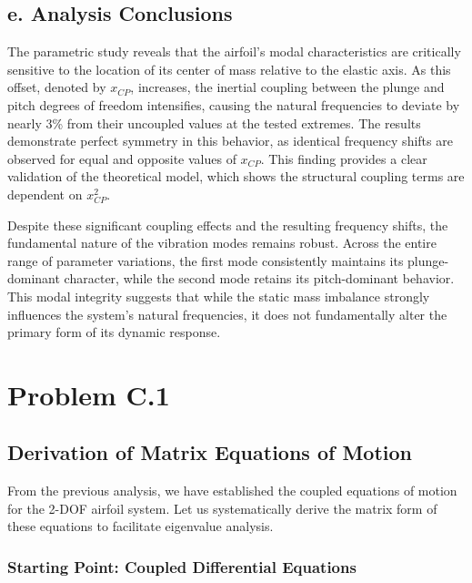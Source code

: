 \documentclass{article}
\begin{document}
\subsection{e. Analysis Conclusions}

The parametric study reveals that the airfoil's modal characteristics are critically sensitive to the location of its center of mass relative to the elastic axis. As this offset, denoted by $x_{CP}$, increases, the inertial coupling between the plunge and pitch degrees of freedom intensifies, causing the natural frequencies to deviate by nearly 3\% from their uncoupled values at the tested extremes. The results demonstrate perfect symmetry in this behavior, as identical frequency shifts are observed for equal and opposite values of $x_{CP}$. This finding provides a clear validation of the theoretical model, which shows the structural coupling terms are dependent on $x_{CP}^2$.

Despite these significant coupling effects and the resulting frequency shifts, the fundamental nature of the vibration modes remains robust. Across the entire range of parameter variations, the first mode consistently maintains its plunge-dominant character, while the second mode retains its pitch-dominant behavior. This modal integrity suggests that while the static mass imbalance strongly influences the system's natural frequencies, it does not fundamentally alter the primary form of its dynamic response.

\newpage
\section{Problem C.1}

\subsection{Derivation of Matrix Equations of Motion}

From the previous analysis, we have established the coupled equations of motion for the 2-DOF airfoil system. Let us systematically derive the matrix form of these equations to facilitate eigenvalue analysis.

\subsubsection{Starting Point: Coupled Differential Equations}
\end{document}
